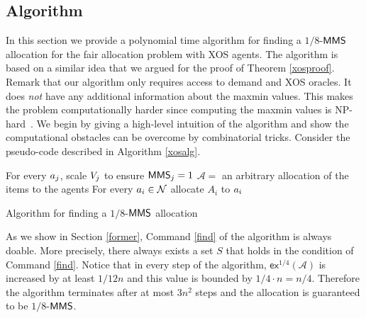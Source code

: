 \subsection{Algorithm}\label{xosalgorithm}
In this section we provide a polynomial time algorithm for finding a $1/8$-$\mathsf{MMS}$ allocation for the fair allocation problem with XOS agents. The algorithm is based on a similar idea that we argued for the proof of Theorem \ref{xosproof}. Remark that our algorithm only requires access to demand and XOS oracles. It does \textit{not} have any additional information about the maxmin values. This makes the problem computationally harder since computing the maxmin values is NP-hard~\cite{epstein2014efficient}. We begin by giving a high-level intuition of the algorithm and show the computational obstacles can be overcome by combinatorial tricks. Consider the pseudo-code described in Algorithm \ref{xosalg}.
\begin{algorithm}%
	For every $a_j$, scale $V_j$ to  ensure $\mathsf{MMS}_j = 1$\;
	$\mathcal{A} = $ an arbitrary allocation of the items to the agents\;
	For every $a_i \in \mathcal{N}$ allocate $A_i$ to $a_i$\;
\caption{Algorithm for finding a $1/8$-$\mathsf{MMS}$ allocation}
\label{xosalg}
\end{algorithm}

As we show in Section \ref{former}, Command \ref{find} of the algorithm is always doable. More precisely, there always exists a set $S$ that holds in the condition of Command \ref{find}. Notice that in every step of the algorithm, $\mathsf{ex}^{1/4}(\mathcal{A})$ is increased by at least $1/12n$ and this value is bounded by $1/4\cdot n = n/4$. Therefore the algorithm terminates after at most $3n^2$ steps and the allocation is guaranteed to be $1/8$-$\mathsf{MMS}$.

